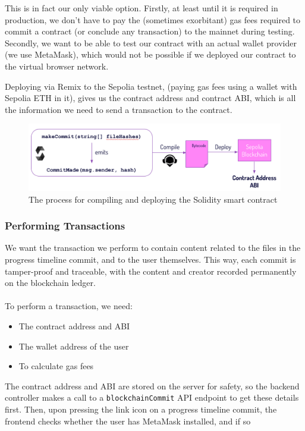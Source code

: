 \documentclass[12pt,a4paper]{article}
\begin{document}
This is in fact our only viable option. Firstly, at least until it is required in production, we don't have to pay the (sometimes exorbitant) gas fees required to commit a contract (or conclude any transaction) to the mainnet during testing. Secondly, we want to be able to test our contract with an actual wallet provider (we use MetaMask), which would not be possible if we deployed our contract to the virtual browser network.

Deploying via Remix to the Sepolia testnet, (paying gas fees using a wallet with Sepolia ETH in it), gives us the contract address and contract ABI, which is all the information we need to send a transaction to the contract. 
\begin{figure}[H]
    \centering
    \includegraphics[scale=0.5]{deploy.png}
    \caption{The process for compiling and deploying the Solidity smart contract}
\end{figure}
\subsubsection{Performing Transactions}
We want the transaction we perform to contain content related to the files in the progress timeline commit, and to the user themselves. This way, each commit is tamper-proof and traceable, with the content and creator recorded permanently on the blockchain ledger.\\\\
To perform a transaction, we need:
\begin{itemize}
    \item The contract address and ABI
    \item The wallet address of the user
    \item To calculate gas fees
\end{itemize}
The contract address and ABI are stored on the server for safety, so the backend controller makes a call to a \verb|blockchainCommit| API endpoint to get these details first. Then, upon pressing the link icon on a progress timeline commit, the frontend checks whether the user has MetaMask installed, and if so
\end{document}
